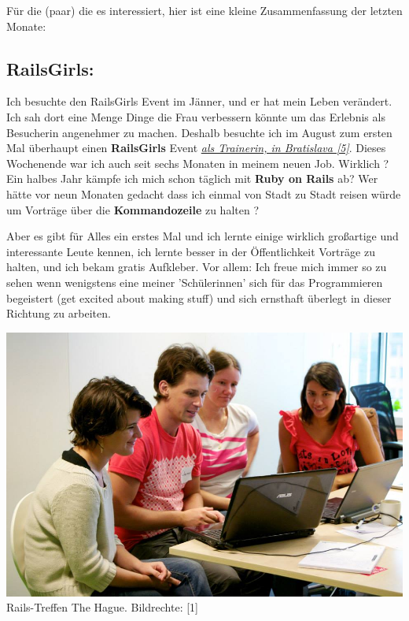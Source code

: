 Für die (paar) die es interessiert, hier ist eine kleine Zusammenfassung der letzten Monate:

\subsection*{RailsGirls:}

Ich besuchte den RailsGirls Event im Jänner, und er hat mein Leben verändert. Ich sah dort eine Menge Dinge die Frau verbessern könnte um das Erlebnis als Besucherin angenehmer zu machen. Deshalb besuchte ich im August zum ersten Mal überhaupt einen \textbf{RailsGirls} Event \href{http://railsgirls.com/bratislava}{\textit{als Trainerin, in Bratislava [5]}}. Dieses Wochenende war ich auch seit sechs Monaten in meinem neuen Job. Wirklich ? Ein halbes Jahr kämpfe ich mich schon täglich mit \textbf{Ruby on Rails} ab? Wer hätte vor neun Monaten gedacht dass ich einmal von Stadt zu Stadt reisen würde um Vorträge über die \textbf{Kommandozeile} zu halten ? 

Aber es gibt für Alles ein erstes Mal und ich lernte einige wirklich großartige und interessante Leute kennen, ich lernte besser in der Öffentlichkeit Vorträge zu halten, und ich bekam gratis Aufkleber. Vor allem: Ich freue mich immer so zu sehen wenn wenigstens eine meiner 'Schülerinnen' sich für das Programmieren begeistert (get excited about making stuff) und sich ernsthaft überlegt in dieser Richtung zu arbeiten.   

\begin{center}
\includegraphics[width=\linewidth]{laura/floor_rg_thehague_3.jpg}
\footnotesize{Rails-Treffen The Hague. Bildrechte: [1]}
\end{center}


